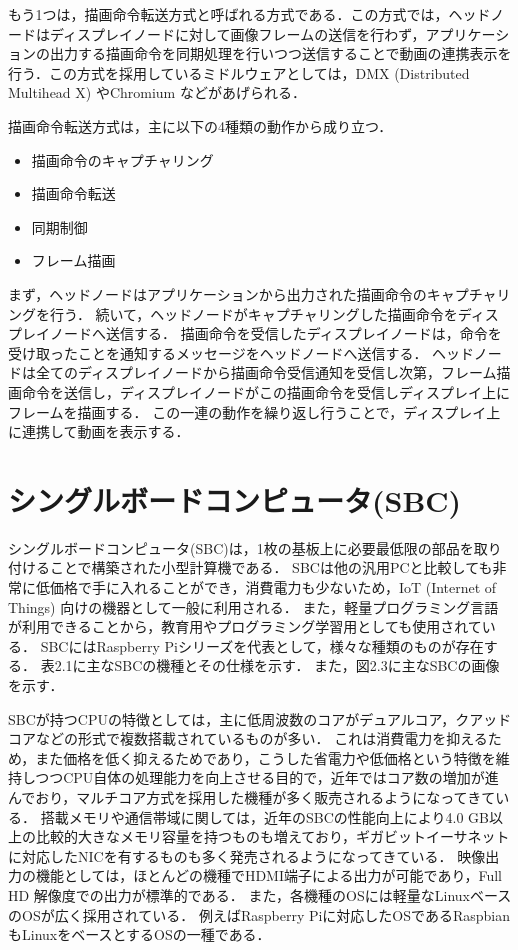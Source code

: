 \documentclass[12pt,a4paper]{jbook}
\begin{document}
もう1つは，描画命令転送方式と呼ばれる方式である．この方式では，ヘッドノードはディスプレイノードに対して画像フレームの送信を行わず，アプリケーションの出力する描画命令を同期処理を行いつつ送信することで動画の連携表示を行う．この方式を採用しているミドルウェアとしては，DMX (Distributed Multihead X) やChromium \cite{chromium}などがあげられる．

描画命令転送方式は，主に以下の4種類の動作から成り立つ．

\begin{itemize}
    \item 描画命令のキャプチャリング
    \item 描画命令転送
    \item 同期制御
    \item フレーム描画
\end{itemize}

  まず，ヘッドノードはアプリケーションから出力された描画命令のキャプチャリングを行う．
  続いて，ヘッドノードがキャプチャリングした描画命令をディスプレイノードへ送信する．
  描画命令を受信したディスプレイノードは，命令を受け取ったことを通知するメッセージをヘッドノードへ送信する．
  ヘッドノードは全てのディスプレイノードから描画命令受信通知を受信し次第，フレーム描画命令を送信し，ディスプレイノードがこの描画命令を受信しディスプレイ上にフレームを描画する．
  この一連の動作を繰り返し行うことで，ディスプレイ上に連携して動画を表示する．

\section{シングルボードコンピュータ(SBC)}

シングルボードコンピュータ(SBC)は，1枚の基板上に必要最低限の部品を取り付けることで構築された小型計算機である．
SBCは他の汎用PCと比較しても非常に低価格で手に入れることができ，消費電力も少ないため，IoT (Internet of Things) 向けの機器として一般に利用される\cite{130007722836,7380571}．
また，軽量プログラミング言語が利用できることから，教育用やプログラミング学習用としても使用されている．
SBCにはRaspberry Piシリーズを代表として，様々な種類のものが存在する．
表2.1に主なSBCの機種とその仕様を示す．
また，図2.3に主なSBCの画像を示す．

SBCが持つCPUの特徴としては，主に低周波数のコアがデュアルコア，クアッドコアなどの形式で複数搭載されているものが多い．
これは消費電力を抑えるため，また価格を低く抑えるためであり，こうした省電力や低価格という特徴を維持しつつCPU自体の処理能力を向上させる目的で，近年ではコア数の増加が進んでおり，マルチコア方式を採用した機種が多く販売されるようになってきている．
搭載メモリや通信帯域に関しては，近年のSBCの性能向上により4.0 GB以上の比較的大きなメモリ容量を持つものも増えており，ギガビットイーサネットに対応したNICを有するものも多く発売されるようになってきている．
映像出力の機能としては，ほとんどの機種でHDMI端子による出力が可能であり，Full HD 解像度での出力が標準的である．
また，各機種のOSには軽量なLinuxベースのOSが広く採用されている．
例えばRaspberry Piに対応したOSであるRaspbian \cite{raspbian}もLinuxをベースとするOSの一種である．
\end{document}
